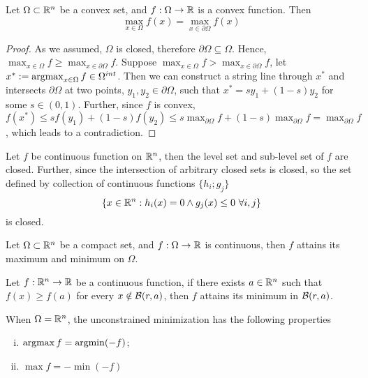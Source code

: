 \documentclass{article}
\begin{document}
    \begin{theorem}
        Let $\Omega \subset \mathbb{R}^n$ be a convex set, and $f: \Omega \to \mathbb{R}$ is a convex function. Then 
        \begin{equation}
            \max_{x \in \Omega} f(x) = \max_{x \in \partial \Omega} f(x)
        \end{equation}
    \end{theorem}
    
    \begin{proof}
        As we assumed, $\Omega$ is closed, therefore $\partial \Omega \subseteq \Omega$. Hence, $\max_{x \in \Omega} f \geq \max_{x \in \partial \Omega} f$. Suppose $\max_{x \in \Omega} f > \max_{x \in \partial \Omega} f$, let $x^* := \operatorname*{argmax}_{x \in \Omega} f \in \Omega^{int}$. Then we can construct a string line through $x^*$ and intersects $\partial \Omega$ at two points, $y_1, y_2 \in \partial \Omega$, such that $x^* = s y_1 + (1-s) y_2$ for some $s \in (0, 1)$. Further, since $f$ is convex, $f(x^*) \leq s f(y_1) + (1-s) f(y_2) \leq s \max_{\partial \Omega} f + (1-s) \max_{\partial \Omega} f = \max_{\partial \Omega} f$, which leads to a contradiction.
    \end{proof}
    
    \begin{proposition}
        Let $f$ be continuous function on $\mathbb{R}^n$, then the level set and sub-level set of $f$ are closed. Further, since the intersection of arbitrary closed sets is closed, so the set defined by collection of continuous functions $\{h_i; g_j\}$
        \begin{equation}
            \{x \in \mathbb{R}^n: h_i(x) = 0 \land g_j(x) \leq 0\ \forall i, j\}
        \end{equation}
        is closed.
    \end{proposition}
    
    \begin{theorem}
        Let $\Omega \subset \mathbb{R}^n$ be a compact set, and $f: \Omega \to \mathbb{R}$ is continuous, then $f$ attains its maximum and minimum on $\Omega$.
    \end{theorem}
    
    \begin{corollary} 
        Let $f: \mathbb{R}^n \to \mathbb{R}$ be a continuous function, if there exists $a \in \mathbb{R}^n$ such that $f(x) \geq f(a)$ for every $x \notin \mathcal{{B}}(r, a)$, then $f$ attains its minimum in $\mathcal{{B}}(r, a)$.
    \end{corollary}
    
    \begin{proposition}
        When $\Omega = \mathbb{R}^n$, the unconstrained minimization has the following properties
        \begin{enumerate}[(i)]
            \item $\operatorname*{argmax} f = \operatorname*{argmin} (-f)$;
            \item $\max f = - \min (-f)$
        \end{enumerate}
    \end{proposition}
    
\end{document}
